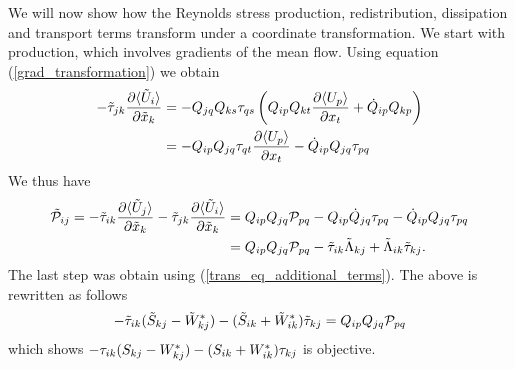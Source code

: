 \documentclass[oneside,a4paper,11pt]{report}
\begin{document}
We will now show how the Reynolds stress production, redistribution, dissipation and transport terms transform under a coordinate transformation. We start with production, which involves gradients of the mean flow. Using equation (\ref{grad_transformation}) we obtain
\begin{align}
-\tilde{\tau}_{jk} \frac{\partial \langle \tilde{U}_i \rangle}{\partial \tilde{x}_k}  &= -Q_{jq}Q_{ks} \tau_{qs} \left ( Q_{ip}Q_{kt} \frac{\partial \langle U_p \rangle}{\partial x_t} + \dot{Q}_{ip}Q_{kp} \right ) \nonumber \\
& = -Q_{ip}Q_{jq} \tau_{qt} \frac{\partial \langle U_p \rangle}{\partial x_t} - \dot{Q}_{ip}Q_{jq} \tau_{pq}
\end{align}
We thus have
\begin{align}
\label{production_transformation}
\tilde{\mathcal{P}}_{ij} = -\tilde{\tau}_{ik} \frac{\partial \langle \tilde{U}_j \rangle}{\partial \tilde{x}_k} - \tilde{\tau}_{jk} \frac{\partial \langle \tilde{U}_i \rangle}{\partial \tilde{x}_k}
& = Q_{ip}Q_{jq} \mathcal{P}_{pq} - Q_{ip}\dot{Q}_{jq} \tau_{pq}  - \dot{Q}_{ip}Q_{jq} \tau_{pq} \nonumber \\
& = Q_{ip}Q_{jq} \mathcal{P}_{pq} - \tilde{\tau}_{ik} \tilde{\Lambda}_{kj}  + \tilde{\Lambda}_{ik} \tilde{\tau}_{kj}.
\end{align}
The last step was obtain using (\ref{trans_eq_additional_terms}). The above is rewritten as follows
\begin{equation}
-\tilde{\tau}_{ik} (\tilde{S}_{kj} - \tilde{W}^*_{kj}) - (\tilde{S}_{ik} + \tilde{W}^*_{ik} ) \tilde{\tau}_{kj} = Q_{ip}Q_{jq} \mathcal{P}_{pq}
\end{equation}
which shows $ -\tau_{ik} (S_{kj} - W^*_{kj}) - (S_{ik} + W^*_{ik} ) \tau_{kj} $ is objective.
\end{document}
